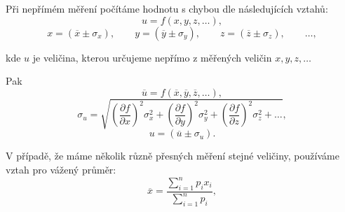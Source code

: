 \documentclass[english]{article}
\begin{document}
%
%	
%
%
%	
%	
Při nepřímém měření počítáme hodnotu s chybou dle následujících vztahů:
	\begin{equation}
	u = f(x, y, z, \ldots),
	\end{equation}
	\begin{displaymath}
	x = (\overline{x} \pm \sigma_x), \qquad
	y = (\overline{y} \pm \sigma_y), \qquad
	z = (\overline{z} \pm \sigma_z), \qquad
	\ldots,
	\end{displaymath}
	
	kde $ u $ je veličina, kterou určujeme nepřímo z měřených veličin $ x, y, z, \ldots $ 
	
	Pak
	\begin{displaymath}
	\overline{u} = f(\overline{x}, \overline{y}, \overline{z}, \ldots),
	\end{displaymath}
	\begin{equation}\label{eq:chyba_neprime_mereni}
	\sigma_u = \sqrt{\left( \frac{\partial f}{\partial x} \right)^2 \sigma^2_x + \left( \frac{\partial f}{\partial y} \right)^2 \sigma^2_y + \left( \frac{\partial f}{\partial z} \right)^2 \sigma^2_z + \ldots},
	\end{equation}
	\begin{displaymath}
	u = (\overline{u} \pm \sigma_ u).
	\end{displaymath}

V případě, že máme několik různě přesných měření stejné veličiny, používáme vztah pro vážený průměr:
	\begin{equation} 
	\label{eq:vazeny_prumer}
	\overline{x}=\frac{\sum\limits_{i=1}^{n}p_{i}x_{i}}{\sum\limits_{i=1}^{n}p_{i}},
	\end{equation}
	
\end{document}
